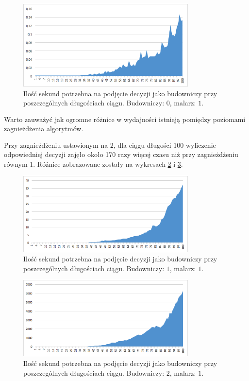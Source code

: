 \documentclass[document]{xmgr}
\begin{document}
\begin{figure}[tbh]
    \centering
    \includegraphics[width = 0.8\textwidth]{images/timeBuilder0Painter1}
    \caption{Ilość sekund potrzebna na podjęcie decyzji jako budowniczy przy poszczególnych długościach ciągu. Budowniczy: $0$, malarz: $1$.}
    \label{fig:builder0painter1}
\end{figure}

Warto zauważyć jak ogromne różnice w wydajności istnieją pomiędzy poziomami zagnieżdżenia algorytmów.

Przy zagnieżdżeniu ustawionym na 2, dla ciągu długości 100 wyliczenie odpowiedniej decyzji zajęło około 170 razy więcej czasu niż przy zagnieżdżeniu równym 1. Różnice zobrazowane zostały na wykresach \ref{fig:builder1painter1} i \ref{fig:builder2painter1}.

\begin{figure}[tbh]
    \centering
    \includegraphics[width = 0.8\textwidth]{images/timeBuilder1Painter1}
    \caption{Ilość sekund potrzebna na podjęcie decyzji jako budowniczy przy poszczególnych długościach ciągu. Budowniczy: $1$, malarz: $1$.}
    \label{fig:builder1painter1}
\end{figure}

\begin{figure}[tbh]
    \centering
    \includegraphics[width = 0.8\textwidth]{images/timeBuilder2Painter1}
    \caption{Ilość sekund potrzebna na podjęcie decyzji jako budowniczy przy poszczególnych długościach ciągu. Budowniczy: $2$, malarz: $1$.}
    \label{fig:builder2painter1}
\end{figure}
\end{document}
